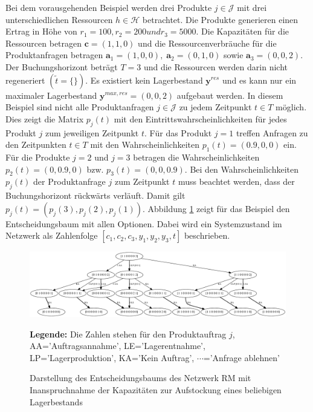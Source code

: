 Bei dem vorausgehenden Beispiel werden drei Produkte $j\in\mathcal{J}$ mit drei unterschiedlichen Ressourcen $h\in\mathcal{H}$ betrachtet. Die Produkte generieren einen Ertrag in Höhe von $r_1=100, r_2=200 und r_3=5000$. Die Kapazitäten für die Ressourcen betragen $\textbf{c}=(1,1,0)$ und die Ressourcenverbräuche für die Produktanfragen betragen $\textbf{a}_1=(1,0,0),\; \textbf{a}_2=(0,1,0)$ sowie $\textbf{a}_3=(0,0,2)$. Der Buchungshorizont beträgt $T=3$ und die Ressourcen werden darin nicht regeneriert $(\tilde{t}=\{\})$. Es existiert kein Lagerbestand $\textbf{y}^{res}$ und es kann nur ein maximaler Lagerbestand $\textbf{y}^{max,res}=(0, 0, 2)$ aufgebaut werden. In diesem Beispiel sind nicht alle Produktanfragen $j\in\mathcal{J}$ zu jedem Zeitpunkt $t\in T$ möglich. Dies zeigt die Matrix $p_{j}(t)$ mit den Eintrittswahrscheinlichkeiten für jedes Produkt $j$ zum jeweiligen Zeitpunkt $t$. Für das Produkt $j=1$ treffen Anfragen zu den Zeitpunkten $t\in T$ mit den Wahrscheinlichkeiten $p_{1}(t)=(0.9, 0, 0)$ ein. Für die Produkte $j=2$ und $j=3$ betragen die Wahrscheinlichkeiten $p_{2}(t)=(0, 0.9, 0)$ bzw. $p_{3}(t)=(0, 0, 0.9)$. Bei den Wahrscheinlichkeiten $p_j(t)$ der Produktanfrage $j$ zum Zeitpunkt $t$ muss beachtet werden, dass der Buchungshorizont rückwärts verläuft. Damit gilt $p_{j}(t)=(p_{j}(3), p_{j}(2), p_{j}(1))$. Abbildung \ref{B7} zeigt für das Beispiel den Entscheidungsbaum mit allen Optionen. Dabei wird ein Systemzustand im Netzwerk als Zahlenfolge $[c_1,c_2,c_3,y_1,y_2,y_3,t]$ beschrieben.
 
\begin{figure}[h!]
  \begin{center}
    \includegraphics[width=200mm, angle=90]{Bilder/Beispiel7.pdf}
    \caption{Darstellung des Entscheidungsbaums des Netzwerk RM mit Inanspruchnahme der Kapazitäten zur Aufstockung eines beliebigen Lagerbestands}  \label{B7}
    {\footnotesize \textbf{Legende:} Die Zahlen stehen für den Produktauftrag $j$, AA='Auftragsannahme', LE='Lagerentnahme', LP='Lagerproduktion', KA='Kein Auftrag', $\cdots$='Anfrage ablehnen'} 
  \end{center}
\end{figure}

